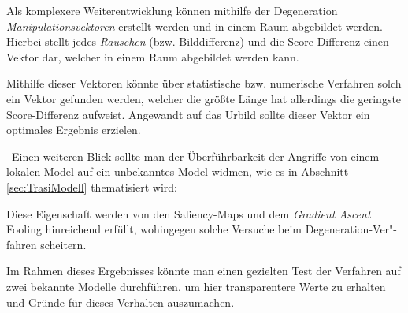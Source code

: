 Als komplexere Weiterentwicklung können mithilfe der Degeneration \textit{Manipulationsvektoren} erstellt werden und in einem Raum abgebildet werden. Hierbei stellt jedes \textit{Rauschen} (bzw. Bilddifferenz) und die Score-Differenz einen Vektor dar, welcher in einem Raum abgebildet werden kann.   

Mithilfe dieser Vektoren könnte über statistische bzw. numerische Verfahren solch ein Vektor gefunden werden, welcher die größte Länge hat allerdings die geringste Score-Differenz aufweist. Angewandt auf das Urbild sollte dieser Vektor ein optimales Ergebnis erzielen.  

~\newline Einen weiteren Blick sollte man der Überführbarkeit der Angriffe von einem lokalen Model auf ein unbekanntes Model widmen, wie es in Abschnitt \ref{sec:TrasiModell} thematisiert wird: 

Diese Eigenschaft werden von den Saliency-Maps und dem \textit{Gradient Ascent} Fooling hinreichend erfüllt, wohingegen solche Versuche beim Degeneration-Ver"-fahren scheitern. 

Im Rahmen dieses Ergebnisses könnte man einen gezielten Test der Verfahren auf zwei bekannte Modelle durchführen, um hier transparentere Werte zu erhalten und Gründe für dieses Verhalten auszumachen. 
